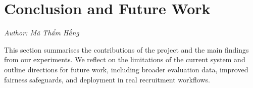\section{Conclusion and Future Work}
\noindent\textit{Author: Mã Thẩm Hằng}


This section summarises the contributions of the project and the main
findings from our experiments. We reflect on the limitations of the current
system and outline directions for future work, including broader evaluation
data, improved fairness safeguards, and deployment in real recruitment
workflows.
